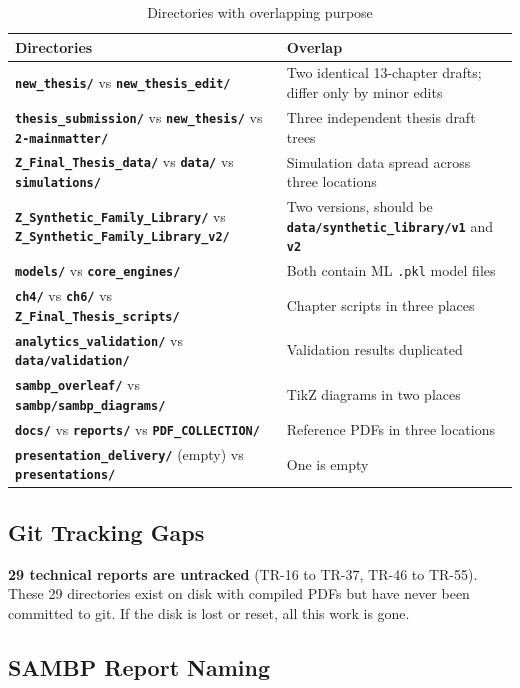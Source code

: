 \documentclass[11pt,a4paper]{article}
\newcommand{\dir}[1]{\texttt{\textbf{#1}}}
\begin{document}
\begin{table}[h!]
\centering
\caption{Directories with overlapping purpose}
\begin{tabularx}{\textwidth}{lX}
\toprule
\textbf{Directories} & \textbf{Overlap} \\
\midrule
\dir{new\_thesis/} vs \dir{new\_thesis\_edit/} & Two identical 13-chapter drafts; differ only by minor edits \\
\dir{thesis\_submission/} vs \dir{new\_thesis/} vs \dir{2-mainmatter/} & Three independent thesis draft trees \\
\dir{Z\_Final\_Thesis\_data/} vs \dir{data/} vs \dir{simulations/} & Simulation data spread across three locations \\
\dir{Z\_Synthetic\_Family\_Library/} vs \dir{Z\_Synthetic\_Family\_Library\_v2/} & Two versions, should be \dir{data/synthetic\_library/v1} and \dir{v2} \\
\dir{models/} vs \dir{core\_engines/} & Both contain ML \texttt{.pkl} model files \\
\dir{ch4/} vs \dir{ch6/} vs \dir{Z\_Final\_Thesis\_scripts/} & Chapter scripts in three places \\
\dir{analytics\_validation/} vs \dir{data/validation/} & Validation results duplicated \\
\dir{sambp\_overleaf/} vs \dir{sambp/sambp\_diagrams/} & TikZ diagrams in two places \\
\dir{docs/} vs \dir{reports/} vs \dir{PDF\_COLLECTION/} & Reference PDFs in three locations \\
\dir{presentation\_delivery/} (empty) vs \dir{presentations/} & One is empty \\
\bottomrule
\end{tabularx}
\end{table}

\subsection{Git Tracking Gaps}

\begin{yellowbox}
\textbf{29 technical reports are untracked} (TR-16 to TR-37, TR-46 to TR-55).
These 29 directories exist on disk with compiled PDFs but have never been
committed to git. If the disk is lost or reset, all this work is gone.
\end{yellowbox}

\subsection{SAMBP Report Naming}
\end{document}

